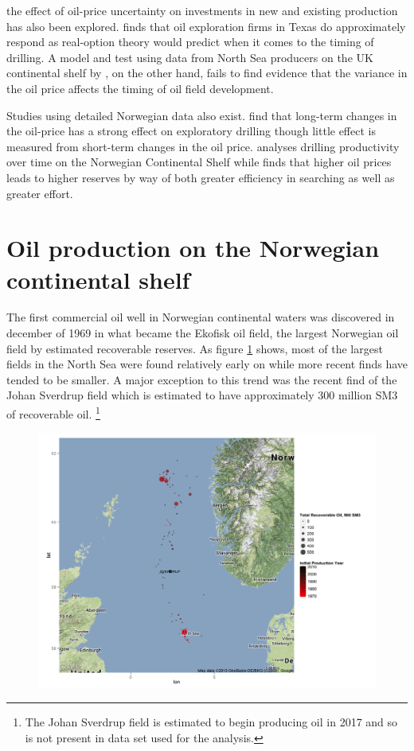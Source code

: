\documentclass[12pt]{scrartcl} %
\begin{document}
the effect of oil-price uncertainty on investments in new and existing production has also been explored.  \citet{kellogg_effect_2010} finds that oil exploration firms in Texas do approximately respond as real-option theory would predict when it comes to the timing of drilling.  A model and test using data from North Sea producers on the UK continental shelf by \citet{hurn_geology_1994}, on the other hand, fails to find evidence that the variance in the oil price affects the timing of oil field development.  

Studies using detailed Norwegian data also exist.  \citet{mohn_exploration_2008} find that long-term changes in the oil-price has a strong effect on exploratory drilling though little effect is measured from short-term changes in the oil price.  \citet{osmundsen_exploration_2010} analyses drilling productivity over time on the Norwegian Continental Shelf while \citet{mohn_efforts_2008} finds that higher oil prices leads to higher reserves by way of both greater efficiency in searching as well as greater effort.  

\section{Oil production on the Norwegian continental shelf}
The first commercial oil well in Norwegian continental waters was discovered in december of 1969 in what became the Ekofisk oil field, the largest Norwegian oil field by estimated recoverable reserves.  As figure \ref{north_sea_reserves} shows, most of the largest fields in the North Sea were found relatively early on while more recent finds have tended to be smaller.  A major exception to this trend was the recent find of the Johan Sverdrup field which is estimated to have approximately 300 million SM3 of recoverable oil. \footnote{The Johan Sverdrup field is estimated to begin producing oil in 2017 and so is not present in data set used for the analysis.}  

\begin{figure}
\includegraphics[width=.8\textwidth]{north_sea_reserves.png}
\caption{}
\label{north_sea_reserves}
\end{figure}
\end{document}
